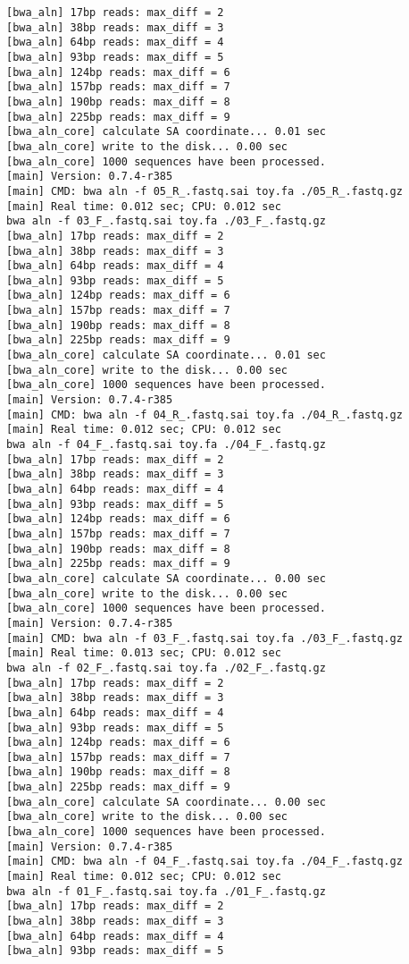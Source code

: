 \documentclass{article}
\begin{document}
\begin{lstlisting}
[bwa_aln] 17bp reads: max_diff = 2
[bwa_aln] 38bp reads: max_diff = 3
[bwa_aln] 64bp reads: max_diff = 4
[bwa_aln] 93bp reads: max_diff = 5
[bwa_aln] 124bp reads: max_diff = 6
[bwa_aln] 157bp reads: max_diff = 7
[bwa_aln] 190bp reads: max_diff = 8
[bwa_aln] 225bp reads: max_diff = 9
[bwa_aln_core] calculate SA coordinate... 0.01 sec
[bwa_aln_core] write to the disk... 0.00 sec
[bwa_aln_core] 1000 sequences have been processed.
[main] Version: 0.7.4-r385
[main] CMD: bwa aln -f 05_R_.fastq.sai toy.fa ./05_R_.fastq.gz
[main] Real time: 0.012 sec; CPU: 0.012 sec
bwa aln -f 03_F_.fastq.sai toy.fa ./03_F_.fastq.gz
[bwa_aln] 17bp reads: max_diff = 2
[bwa_aln] 38bp reads: max_diff = 3
[bwa_aln] 64bp reads: max_diff = 4
[bwa_aln] 93bp reads: max_diff = 5
[bwa_aln] 124bp reads: max_diff = 6
[bwa_aln] 157bp reads: max_diff = 7
[bwa_aln] 190bp reads: max_diff = 8
[bwa_aln] 225bp reads: max_diff = 9
[bwa_aln_core] calculate SA coordinate... 0.01 sec
[bwa_aln_core] write to the disk... 0.00 sec
[bwa_aln_core] 1000 sequences have been processed.
[main] Version: 0.7.4-r385
[main] CMD: bwa aln -f 04_R_.fastq.sai toy.fa ./04_R_.fastq.gz
[main] Real time: 0.012 sec; CPU: 0.012 sec
bwa aln -f 04_F_.fastq.sai toy.fa ./04_F_.fastq.gz
[bwa_aln] 17bp reads: max_diff = 2
[bwa_aln] 38bp reads: max_diff = 3
[bwa_aln] 64bp reads: max_diff = 4
[bwa_aln] 93bp reads: max_diff = 5
[bwa_aln] 124bp reads: max_diff = 6
[bwa_aln] 157bp reads: max_diff = 7
[bwa_aln] 190bp reads: max_diff = 8
[bwa_aln] 225bp reads: max_diff = 9
[bwa_aln_core] calculate SA coordinate... 0.00 sec
[bwa_aln_core] write to the disk... 0.00 sec
[bwa_aln_core] 1000 sequences have been processed.
[main] Version: 0.7.4-r385
[main] CMD: bwa aln -f 03_F_.fastq.sai toy.fa ./03_F_.fastq.gz
[main] Real time: 0.013 sec; CPU: 0.012 sec
bwa aln -f 02_F_.fastq.sai toy.fa ./02_F_.fastq.gz
[bwa_aln] 17bp reads: max_diff = 2
[bwa_aln] 38bp reads: max_diff = 3
[bwa_aln] 64bp reads: max_diff = 4
[bwa_aln] 93bp reads: max_diff = 5
[bwa_aln] 124bp reads: max_diff = 6
[bwa_aln] 157bp reads: max_diff = 7
[bwa_aln] 190bp reads: max_diff = 8
[bwa_aln] 225bp reads: max_diff = 9
[bwa_aln_core] calculate SA coordinate... 0.00 sec
[bwa_aln_core] write to the disk... 0.00 sec
[bwa_aln_core] 1000 sequences have been processed.
[main] Version: 0.7.4-r385
[main] CMD: bwa aln -f 04_F_.fastq.sai toy.fa ./04_F_.fastq.gz
[main] Real time: 0.012 sec; CPU: 0.012 sec
bwa aln -f 01_F_.fastq.sai toy.fa ./01_F_.fastq.gz
[bwa_aln] 17bp reads: max_diff = 2
[bwa_aln] 38bp reads: max_diff = 3
[bwa_aln] 64bp reads: max_diff = 4
[bwa_aln] 93bp reads: max_diff = 5

\end{lstlisting}
\end{document}
